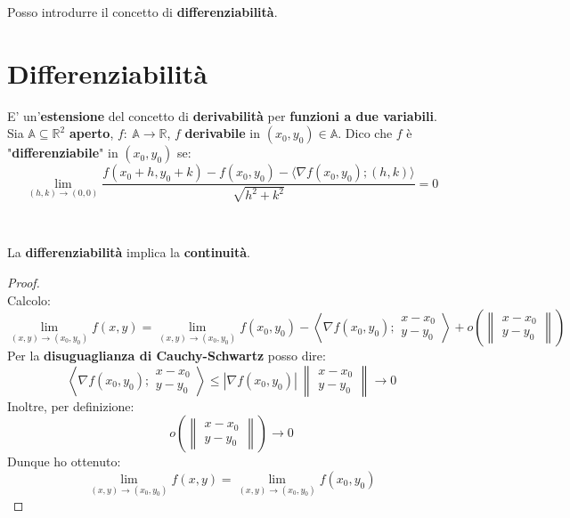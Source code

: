 \documentclass[a4paper, oneside]{article}
\newcommand\R{\mathbb{R}}
\newcommand\A{\mathbb{A}}
\begin{document}
    \noindent Posso introdurre il concetto di \textbf{differenziabilità}.

    \newpage

    \section{Differenziabilità}

    E' un'\textbf{estensione} del concetto di \textbf{derivabilità} per \textbf{funzioni a due variabili}.\\

    \noindent Sia $\A\subseteq\R^2$ \textbf{aperto}, $f: \ \A\to\R$, $f$ \textbf{derivabile} in $(x_0,y_0)\in\A$. Dico che $f$ è "\textbf{differenziabile}" in $(x_0,y_0)$ se:
    \[\lim_{(h,k)\to(0,0)} \frac{f(x_0+h,y_0+k) - f(x_0,y_0) - \langle \nabla f(x_0,y_0);(h,k)\rangle}{\sqrt{h^2+k^2}} = 0\]

    \hfill\\
    \begin{observation}
        La \textbf{differenziabilità} implica la \textbf{continuità}.
    \end{observation}
    \begin{proof}\hfill\\
        Calcolo:
        \[\lim_{(x,y)\to(x_0,y_0)} f(x,y) = \lim_{(x,y)\to(x_0,y_0)} f(x_0,y_0) - \left\langle \nabla f(x_0,y_0); \begin{matrix}
            x-x_0 \\ y-y_0
        \end{matrix}\right\rangle + o \left(\left\lVert  \begin{matrix} x-x_0 \\ y-y_0 \end{matrix}\right\rVert \right)  \]
        Per la \textbf{disuguaglianza di Cauchy-Schwartz} posso dire:
        \[\left\langle \nabla f(x_0,y_0); \begin{matrix}
            x-x_0 \\ y-y_0
        \end{matrix}\right\rangle \leq \left|\nabla f(x_0,y_0)\right| \ \left\lVert  \begin{matrix} x-x_0 \\ y-y_0 \end{matrix}\right\rVert \to 0\]
        Inoltre, per definizione:
        \[o \left(\left\lVert  \begin{matrix} x-x_0 \\ y-y_0 \end{matrix}\right\rVert\right) \to 0\]
        Dunque ho ottenuto:
        \[\lim_{(x,y)\to(x_0,y_0)} f(x,y) = \lim_{(x,y)\to(x_0,y_0)} f(x_0,y_0)\]
    \end{proof}
\end{document}
